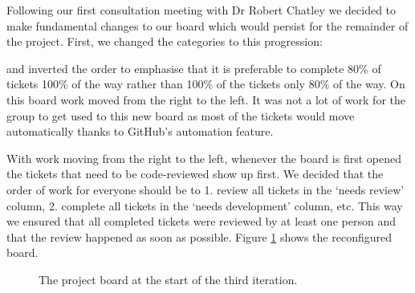 Following our first consultation meeting with Dr Robert Chatley we decided to make fundamental changes to our board which would persist for the remainder of the project. First, we changed the categories to this progression:

\begin{figure}[H]
\centering
{}
\end{figure}

and inverted the order to emphasise that it is preferable to complete 80\% of tickets 100\% of the way rather than 100\% of the tickets only 80\% of the way. On this board work moved from the right to the left. It was not a lot of work for the group to get used to this new board as most of the tickets would move automatically thanks to GitHub's automation feature. 

With work moving from the right to the left, whenever the board is first opened the tickets that need to be code-reviewed show up first. We decided that the order of work for everyone should be to 1. review all tickets in the `needs review' column, 2. complete all tickets in the `needs development' column, etc. This way we ensured that all completed tickets were reviewed by at least one person and that the review happened as soon as possible. Figure \ref{board} shows the reconfigured board.

\begin{figure}[htbp]
\centering
{}
\caption{The project board at the start of the third iteration.}
\label{board}
\end{figure}

